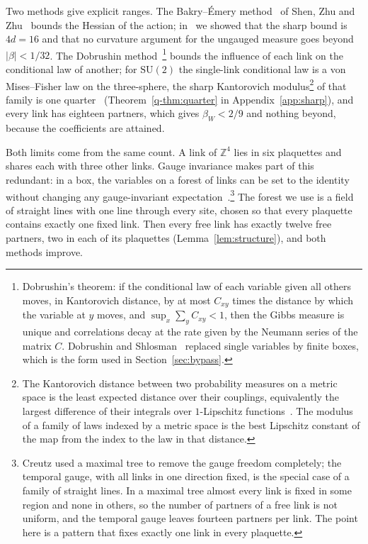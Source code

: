 \documentclass[11pt]{amsart}
\theoremstyle{definition}
\theoremstyle{remark}
\numberwithin{equation}{section}
\newcommand{\Z}{\mathbb{Z}}
\newcommand{\SU}{\mathrm{SU}}
\begin{document}
Two methods give explicit ranges. The Bakry--\'Emery
method~\cite{BE85,BGL14} of Shen, Zhu and Zhu~\cite{SZZ23} bounds the
Hessian of the action; in~\cite{BB26a} we showed that the sharp bound is
$4d=16$ and that no curvature argument for the ungauged measure goes beyond
$|\beta|<1/32$. The Dobrushin method~\cite{Dob68,Dob70}\footnote{Dobrushin's theorem: if the conditional law of each variable given all others moves, in Kantorovich distance, by at most $C_{xy}$ times the distance by which the variable at $y$ moves, and $\sup_x\sum_yC_{xy}<1$, then the Gibbs measure is unique and correlations decay at the rate given by the Neumann series of the matrix $C$. Dobrushin and Shlosman~\cite{DS85} replaced single variables by finite boxes, which is the form used in Section~\ref{sec:bypass}.} bounds the influence
of each link on the conditional law of another; for $\SU(2)$ the single-link
conditional law is a von Mises--Fisher law on the three-sphere, the sharp
Kantorovich modulus\footnote{The Kantorovich distance between two probability measures on a metric space is the least expected distance over their couplings, equivalently the largest difference of their integrals over $1$-Lipschitz functions~\cite{Vil09}. The modulus of a family of laws indexed by a metric space is the best Lipschitz constant of the map from the index to the law in that distance.} of that family is one quarter~\cite{BB26a} (Theorem~\ref{q-thm:quarter} in Appendix~\ref{app:sharp}), and
every link has eighteen partners, which gives $\beta_W<2/9$ and nothing
beyond, because the coefficients are attained.

Both limits come from the same count. A link of $\Z^4$ lies in six
plaquettes and shares each with three other links. Gauge invariance makes
part of this redundant: in a box, the variables on a forest of links can be
set to the identity without changing any gauge-invariant
expectation~\cite{Cre77}.\footnote{Creutz used a maximal tree to remove the
gauge freedom completely; the temporal gauge, with all links in one
direction fixed, is the special case of a family of straight lines. In a
maximal tree almost every link is fixed in some region and none in others,
so the number of partners of a free link is not uniform, and the temporal
gauge leaves fourteen partners per link. The point here is a pattern that
fixes exactly one link in every plaquette.} The forest we use is a field of
straight lines with one line through every site, chosen so that every
plaquette contains exactly one fixed link. Then every free link has exactly
twelve free partners, two in each of its plaquettes
(Lemma~\ref{lem:structure}), and both methods improve.
\end{document}
